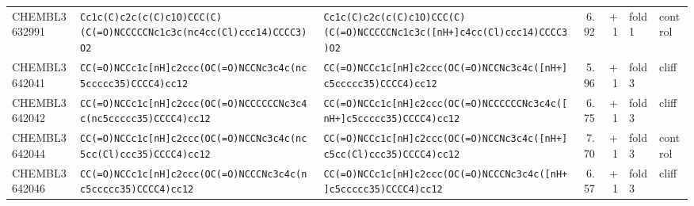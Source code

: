 \begin{longtable}{l p{4.4cm} p{4.4cm} r r l l}
CHEMBL3632991 & \texttt{Cc1c(\allowbreak{}C)\allowbreak{}c2c(\allowbreak{}c(\allowbreak{}C)\allowbreak{}c1O)\allowbreak{}CCC(\allowbreak{}C)\allowbreak{}(\allowbreak{}C(\allowbreak{}=\allowbreak{}O)\allowbreak{}NCCCCCNc1c3c(\allowbreak{}nc4cc(\allowbreak{}Cl)\allowbreak{}ccc14)\allowbreak{}CCCC3)\allowbreak{}O2} & \texttt{Cc1c(\allowbreak{}C)\allowbreak{}c2c(\allowbreak{}c(\allowbreak{}C)\allowbreak{}c1O)\allowbreak{}CCC(\allowbreak{}C)\allowbreak{}(\allowbreak{}C(\allowbreak{}=\allowbreak{}O)\allowbreak{}NCCCCCNc1c3c(\allowbreak{}[nH+]\allowbreak{}c4cc(\allowbreak{}Cl)\allowbreak{}ccc14)\allowbreak{}CCCC3)\allowbreak{}O2} & 6.92 & +1 & fold 1 & control \\
CHEMBL3642041 & \texttt{CC(\allowbreak{}=\allowbreak{}O)\allowbreak{}NCCc1c[nH]\allowbreak{}c2ccc(\allowbreak{}OC(\allowbreak{}=\allowbreak{}O)\allowbreak{}NCCNc3c4c(\allowbreak{}nc5ccccc35)\allowbreak{}CCCC4)\allowbreak{}cc12} & \texttt{CC(\allowbreak{}=\allowbreak{}O)\allowbreak{}NCCc1c[nH]\allowbreak{}c2ccc(\allowbreak{}OC(\allowbreak{}=\allowbreak{}O)\allowbreak{}NCCNc3c4c(\allowbreak{}[nH+]\allowbreak{}c5ccccc35)\allowbreak{}CCCC4)\allowbreak{}cc12} & 5.96 & +1 & fold 3 & cliff \\
CHEMBL3642042 & \texttt{CC(\allowbreak{}=\allowbreak{}O)\allowbreak{}NCCc1c[nH]\allowbreak{}c2ccc(\allowbreak{}OC(\allowbreak{}=\allowbreak{}O)\allowbreak{}NCCCCCCNc3c4c(\allowbreak{}nc5ccccc35)\allowbreak{}CCCC4)\allowbreak{}cc12} & \texttt{CC(\allowbreak{}=\allowbreak{}O)\allowbreak{}NCCc1c[nH]\allowbreak{}c2ccc(\allowbreak{}OC(\allowbreak{}=\allowbreak{}O)\allowbreak{}NCCCCCCNc3c4c(\allowbreak{}[nH+]\allowbreak{}c5ccccc35)\allowbreak{}CCCC4)\allowbreak{}cc12} & 6.75 & +1 & fold 3 & cliff \\
CHEMBL3642044 & \texttt{CC(\allowbreak{}=\allowbreak{}O)\allowbreak{}NCCc1c[nH]\allowbreak{}c2ccc(\allowbreak{}OC(\allowbreak{}=\allowbreak{}O)\allowbreak{}NCCNc3c4c(\allowbreak{}nc5cc(\allowbreak{}Cl)\allowbreak{}ccc35)\allowbreak{}CCCC4)\allowbreak{}cc12} & \texttt{CC(\allowbreak{}=\allowbreak{}O)\allowbreak{}NCCc1c[nH]\allowbreak{}c2ccc(\allowbreak{}OC(\allowbreak{}=\allowbreak{}O)\allowbreak{}NCCNc3c4c(\allowbreak{}[nH+]\allowbreak{}c5cc(\allowbreak{}Cl)\allowbreak{}ccc35)\allowbreak{}CCCC4)\allowbreak{}cc12} & 7.70 & +1 & fold 3 & control \\
CHEMBL3642046 & \texttt{CC(\allowbreak{}=\allowbreak{}O)\allowbreak{}NCCc1c[nH]\allowbreak{}c2ccc(\allowbreak{}OC(\allowbreak{}=\allowbreak{}O)\allowbreak{}NCCCNc3c4c(\allowbreak{}nc5ccccc35)\allowbreak{}CCCC4)\allowbreak{}cc12} & \texttt{CC(\allowbreak{}=\allowbreak{}O)\allowbreak{}NCCc1c[nH]\allowbreak{}c2ccc(\allowbreak{}OC(\allowbreak{}=\allowbreak{}O)\allowbreak{}NCCCNc3c4c(\allowbreak{}[nH+]\allowbreak{}c5ccccc35)\allowbreak{}CCCC4)\allowbreak{}cc12} & 6.57 & +1 & fold 3 & cliff \\

\end{longtable}
